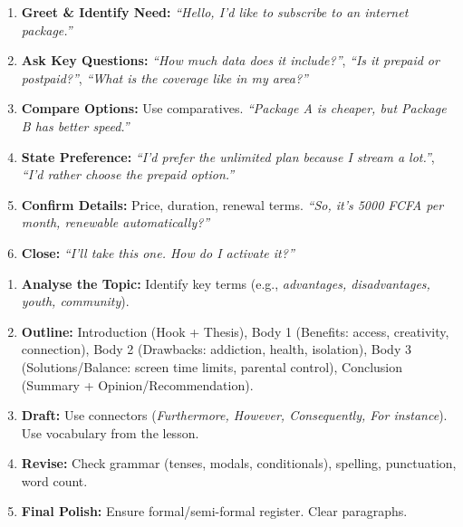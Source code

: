 \documentclass[11pt]{article}
\begin{document}
\begin{bilan}
\begin{methode}
\begin{enumerate}
\item \textbf{Greet \& Identify Need:} \emph{``Hello, I'd like to subscribe to an internet package.''}
\item \textbf{Ask Key Questions:} \emph{``How much data does it include?''}, \emph{``Is it prepaid or postpaid?''}, \emph{``What is the coverage like in my area?''}
\item \textbf{Compare Options:} Use comparatives. \emph{``Package A is cheaper, but Package B has better speed.''}
\item \textbf{State Preference:} \emph{``I'd prefer the unlimited plan because I stream a lot.''}, \emph{``I'd rather choose the prepaid option.''}
\item \textbf{Confirm Details:} Price, duration, renewal terms. \emph{``So, it's 5000 FCFA per month, renewable automatically?''}
\item \textbf{Close:} \emph{``I'll take this one. How do I activate it?''}
\end{enumerate}
\end{methode}

\begin{methode}
\begin{enumerate}
\item \textbf{Analyse the Topic:} Identify key terms (e.g., \emph{advantages, disadvantages, youth, community}).
\item \textbf{Outline:} Introduction (Hook + Thesis), Body 1 (Benefits: access, creativity, connection), Body 2 (Drawbacks: addiction, health, isolation), Body 3 (Solutions/Balance: screen time limits, parental control), Conclusion (Summary + Opinion/Recommendation).
\item \textbf{Draft:} Use connectors (\emph{Furthermore, However, Consequently, For instance}). Use vocabulary from the lesson.
\item \textbf{Revise:} Check grammar (tenses, modals, conditionals), spelling, punctuation, word count.
\item \textbf{Final Polish:} Ensure formal/semi-formal register. Clear paragraphs.
\end{enumerate}
\end{methode}

\end{bilan}
\end{document}
